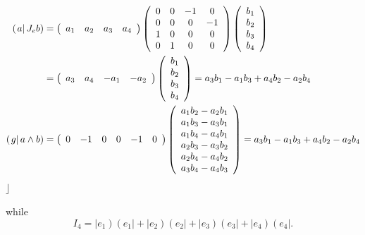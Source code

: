 \documentclass[aps,preprint]{revtex4}%
\begin{document}
\begin{align}
\left(  \left.  a\right\vert J_{e}b\right)   &  =\left(
\begin{array}
[c]{cccc}%
a_{1} & a_{2} & a_{3} & a_{4}%
\end{array}
\right)  \left(
\begin{array}
[c]{cccc}%
0 & 0 & -1 & 0\\
0 & 0 & 0 & -1\\
1 & 0 & 0 & 0\\
0 & 1 & 0 & 0
\end{array}
\right)  \left(
\begin{array}
[c]{c}%
b_{1}\\
b_{2}\\
b_{3}\\
b_{4}%
\end{array}
\right) \\
&  =\left(
\begin{array}
[c]{cccc}%
a_{3} & a_{4} & -a_{1} & -a_{2}%
\end{array}
\right)  \left(
\begin{array}
[c]{c}%
b_{1}\\
b_{2}\\
b_{3}\\
b_{4}%
\end{array}
\right)  =a_{3}b_{1}-a_{1}b_{3}+a_{4}b_{2}-a_{2}b_{4}\\
\left(  \left.  g\right\vert a\wedge b\right)   &  =\left(
\begin{array}
[c]{cccccc}%
0 & -1 & 0 & 0 & -1 & 0
\end{array}
\right)  \left(
\begin{array}
[c]{c}%
a_{1}b_{2}-a_{2}b_{1}\\
a_{1}b_{3}-a_{3}b_{1}\\
a_{1}b_{4}-a_{4}b_{1}\\
a_{2}b_{3}-a_{3}b_{2}\\
a_{2}b_{4}-a_{4}b_{2}\\
a_{3}b_{4}-a_{4}b_{3}%
\end{array}
\right)  =a_{3}b_{1}-a_{1}b_{3}+a_{4}b_{2}-a_{2}b_{4}%
\end{align}
$\rfloor$

while
\begin{equation}
I_{4}=\left\vert e_{1}\right)  \left(  e_{1}\right\vert +\left\vert
e_{2}\right)  \left(  e_{2}\right\vert +\left\vert e_{3}\right)  \left(
e_{3}\right\vert +\left\vert e_{4}\right)  \left(  e_{4}\right\vert .
\end{equation}
\end{document}
